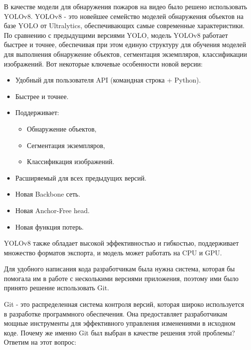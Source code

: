     В качестве модели для обнаружения пожаров на видео было решено использовать YOLOv8. YOLOv8 - это новейшее семейство моделей обнаружения объектов на базе YOLO от Ultralytics, обеспечивающих самые современные характеристики. По сравнению с предыдущими версиями YOLO, модель YOLOv8 работает быстрее и точнее, обеспечивая при этом единую структуру для обучения моделей для выполнения обнаружение объектов, сегментация экземпляров, классификации изображений. Вот некоторые ключевые особенности новой версии:

    \begin{itemize}
        \item Удобный для пользователя API (командная строка + Python).
        \item Быстрее и точнее.
        \item Поддерживает:
            \begin{itemize}
                \item Обнаружение объектов,
                \item Сегментация экземпляров,
                \item Классификация изображений.
            \end{itemize}
        \item Расширяемый для всех предыдущих версий.
        \item Новая Backbone сеть.
        \item Новая Anchor-Free head.
        \item Новая функция потерь.
    \end{itemize}

    YOLOv8 также обладает высокой эффективностью и гибкостью, поддерживает множество форматов экспорта, и модель может работать на CPU и GPU.

    Для удобного написания кода разработчикам была нужна система, которая бы помогала им в работе с несколькими версиями приложения, поэтому ими было принято решение использовать Git. 

    Git - это распределенная система контроля версий, которая широко используется в разработке программного обеспечения. Она предоставляет разработчикам мощные инструменты для эффективного управления изменениями в исходном коде. Почему же именно Git был выбран в качестве решения этой проблемы? Ответим на этот вопрос:

